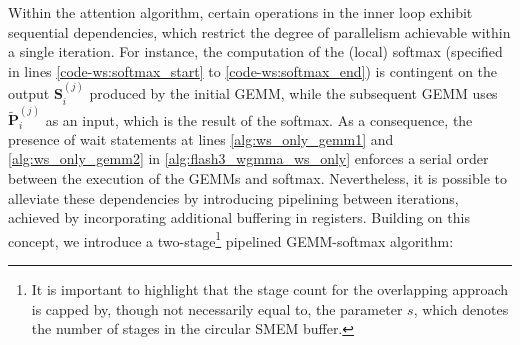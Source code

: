 Within the attention algorithm, certain operations in the inner loop exhibit sequential dependencies, which restrict the degree of parallelism achievable within a single iteration. For instance, the computation of the (local) softmax (specified in lines \ref{code-ws:softmax_start} to \ref{code-ws:softmax_end}) is contingent on the output $\mathbf{S}_i^{(j)}$ produced by the initial GEMM, while the subsequent GEMM uses $\widetilde{\mathbf{P}}_i^{(j)}$ as an input, which is the result of the softmax. As a consequence, the presence of wait statements at lines \ref{alg:ws_only_gemm1} and \ref{alg:ws_only_gemm2} in \cref{alg:flash3_wgmma_ws_only} enforces a serial order between the execution of the GEMMs and softmax. Nevertheless, it is possible to alleviate these dependencies by introducing pipelining between iterations, achieved by incorporating additional buffering in registers. Building on this concept, we introduce a two-stage\footnote{It is important to highlight that the stage count for the overlapping approach is capped by, though not necessarily equal to, the parameter $s$, which denotes the number of stages in the circular SMEM buffer.} pipelined GEMM-softmax algorithm:

